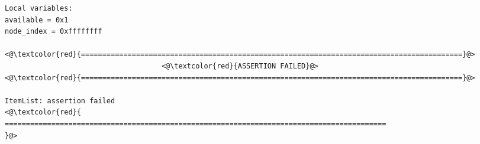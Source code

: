 \begin{adjustwidth}{-3.3cm}{-1cm}
\begin{allintypewriter}
\begin{multicols*}{2}
\begin{lstlisting}[numbers=none]
Local variables: 
available = 0x1
node_index = 0xffffffff

<@\textcolor{red}{==========================================================================================}@>
                                     <@\textcolor{red}{ASSERTION FAILED}@>
<@\textcolor{red}{==========================================================================================}@>

ItemList: assertion failed
<@\textcolor{red}{
==========================================================================================
}@>

\end{lstlisting}

\end{multicols*}

\end{allintypewriter}

\end{adjustwidth}


